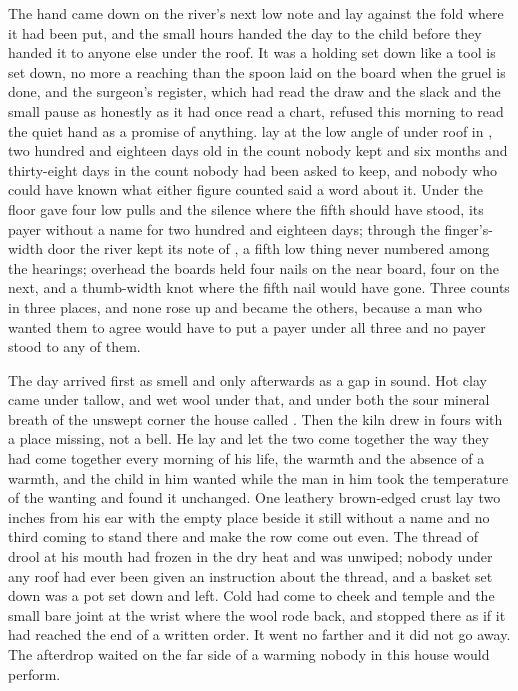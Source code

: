 
The hand came down on the river's next low note and lay against the fold where it had been put, and the small hours handed the day to the child before they handed it to anyone else under the roof. It was a holding set down like a tool is set down, no more a reaching than the spoon laid on the board when the gruel is done, and the surgeon's register, which had read the draw and the slack and the small pause as honestly as it had once read a chart, refused this morning to read the quiet hand as a promise of anything.  lay at the low angle of  under  roof in , two hundred and eighteen days old in the count nobody kept and six months and thirty-eight days in the count nobody had been asked to keep, and nobody who could have known what either figure counted said a word about it. Under the floor  gave four low pulls and the silence where the fifth should have stood, its payer without a name for two hundred and eighteen days; through the finger's-width door the river kept its note of , a fifth low thing never numbered among the hearings; overhead the boards held four nails on the near board, four on the next, and a thumb-width knot where the fifth nail would have gone. Three counts in three places, and none rose up and became the others, because a man who wanted them to agree would have to put a payer under all three and no payer stood to any of them.

The day arrived first as smell and only afterwards as a gap in sound. Hot clay came under tallow, and wet wool under that, and under both the sour mineral breath of the unswept corner the house called . Then the kiln drew in fours with a place missing, not a bell. He lay and let the two come together the way they had come together every morning of his life, the warmth and the absence of a warmth, and the child in him wanted while the man in him took the temperature of the wanting and found it unchanged. One leathery brown-edged crust lay two inches from his ear with the empty place beside it still without a name and no third coming to stand there and make the row come out even. The thread of drool at his mouth had frozen in the dry heat and was unwiped; nobody under any roof had ever been given an instruction about the thread, and a basket set down was a pot set down and left. Cold had come to cheek and temple and the small bare joint at the wrist where the wool rode back, and stopped there as if it had reached the end of a written order. It went no farther and it did not go away. The afterdrop waited on the far side of a warming nobody in this house would perform.


